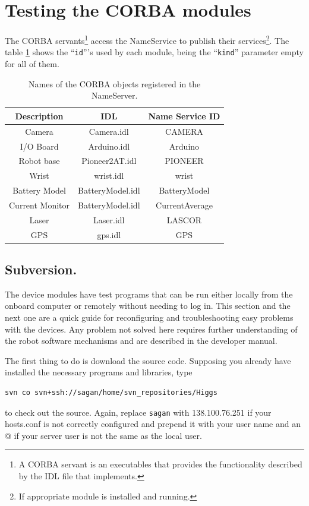\section{Testing the CORBA modules}

The CORBA servants\footnote{A CORBA servant is an executables that provides the functionality described by the IDL file that implements.} access the NameService to publish their services\footnote{If appropriate module is installed and running.}. The table \ref{tab:names_ID_CORBA} shows the ``\texttt{id}'''s used by each module, being the ``\texttt{kind}'' parameter empty for all of them.

\begin{table}
\begin{center}
\begin{tabular}{ccc}
\textbf{Description} & \textbf{IDL} & \textbf{Name Service ID} \\ 
\hline
Camera & Camera.idl & CAMERA \\ 
I/O Board & Arduino.idl & Arduino \\ 
Robot base & Pioneer2AT.idl & PIONEER \\ 
Wrist & wrist.idl & wrist \\ 
Battery Model & BatteryModel.idl & BatteryModel \\ 
Current Monitor & BatteryModel.idl & CurrentAverage \\ 
Laser & Laser.idl & LASCOR \\ 
GPS & gps.idl & GPS
\end{tabular}
\end{center}
\caption{Names of the CORBA objects registered in the NameServer.}
\label{tab:names_ID_CORBA}
\end{table} 

\subsection{Subversion.}
The device modules have test programs that can be run either locally from the onboard computer or remotely
without needing to log in. This section and the next one are a quick guide for reconfiguring and troubleshooting easy problems with the devices. Any problem not solved here requires further understanding of the robot software mechanisms and are described in the developer manual.

The first thing to do is download the source code. Supposing you already have installed the necessary programs and libraries, type
\begin{verbatim}
svn co svn+ssh://sagan/home/svn_repositories/Higgs
\end{verbatim}
to check out the source. Again, replace \verb"sagan" with 138.100.76.251 if your hosts.conf is not correctly configured and prepend it with your user name and an @ if your server user is not the same as the local user.

